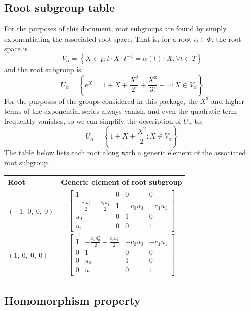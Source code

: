 \documentclass[11pt]{article}
\newcommand{\noi}{\noindent}
\newcommand{\inv}{^{-1}}
\newcommand{\lb}{\left\{}
\newcommand{\rb}{\right\}}
\newcommand{\frakg}{\mathfrak{g}}
\theoremstyle{definition}
\begin{document}
\subsection{Root subgroup table}

\noi For the purposes of this document, root subgroups are found by simply exponentiating the associated root space. That is, for a root $\alpha \in \Phi$, the root space is
\[
	V_\alpha = \lb X \in \frakg : t \cdot X \cdot t \inv = \alpha(t) \cdot X, \forall t \in T \rb
\]
and the root subgroup is
\[
	U_\alpha = \lb e^X = 1 + X + \frac{X^2}{2!} + \frac{X^3}{3!} + \cdots : X \in V_\alpha \rb
\]
For the purposes of the groups considered in this package, the $X^3$ and higher terms of the exponential series always vanish, and even the quadratic term frequently vanishes, so we can simplify the description of $U_\alpha$ to:
\[
	U_\alpha = \lb 1 + X + \frac{X^2}{2} : X \in V_\alpha \rb
\]
The table below lists each root along with a generic element of the associated root subgroup.

\noindent \begin{longtable}{|l|c|}
    \hline
    \textbf{Root} & \textbf{Generic element of root subgroup} \\
    \hline
    \endhead
    $\left( -1, \  0, \  0, \  0\right)$ & ${\left[\begin{matrix}1 & 0 & 0 & 0\\- \frac{c_{0} u_{0}^{2}}{2} - \frac{c_{1} u_{1}^{2}}{2} & 1 & - c_{0} u_{0} & - c_{1} u_{1}\\u_{0} & 0 & 1 & 0\\u_{1} & 0 & 0 & 1\end{matrix}\right]}$ \\
    \hline
    $\left( 1, \  0, \  0, \  0\right)$ & ${\left[\begin{matrix}1 & - \frac{c_{0} u_{0}^{2}}{2} - \frac{c_{1} u_{1}^{2}}{2} & - c_{0} u_{0} & - c_{1} u_{1}\\0 & 1 & 0 & 0\\0 & u_{0} & 1 & 0\\0 & u_{1} & 0 & 1\end{matrix}\right]}$ \\
    \hline
\end{longtable}


\subsection{Homomorphism property}
\end{document}
